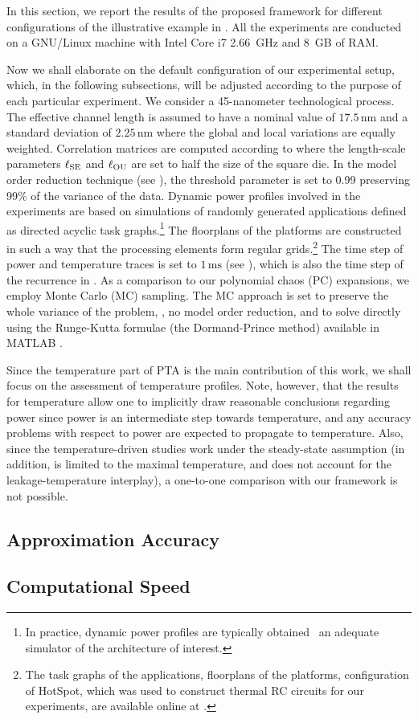 
In this section, we report the results of the proposed framework for different configurations of the illustrative example in .
All the experiments are conducted on a GNU/Linux machine with Intel Core i7 2.66~GHz and 8~GB of RAM.

Now we shall elaborate on the default configuration of our experimental setup, which, in the following subsections, will be adjusted according to the purpose of each particular experiment.
We consider a 45-nanometer technological process.
The effective channel length is assumed to have a nominal value of $17.5\,\text{nm}$ \cite{ptm} and a standard deviation of $2.25\,\text{nm}$ where the global and local variations are equally weighted.
Correlation matrices are computed according to  where the length-scale parameters $\ell_{\text{SE}}$ and $\ell_{\text{OU}}$ are set to half the size of the square die.
In the model order reduction technique (see ), the threshold parameter is set to 0.99 preserving 99\% of the variance of the data.
Dynamic power profiles involved in the experiments are based on simulations of randomly generated applications defined as directed acyclic task graphs.\footnote{In practice, dynamic power profiles are typically obtained \via\ an adequate simulator of the architecture of interest.}
The floorplans of the platforms are constructed in such a way that the processing elements form regular grids.\footnote{The task graphs of the applications, floorplans of the platforms, configuration of HotSpot, which was used to construct thermal RC circuits for our experiments, are available online at \cite{sources}.}
The time step of power and temperature traces is set to $1\,\text{ms}$ (see ), which is also the time step of the recurrence in .
As a comparison to our polynomial chaos (PC) expansions, we employ Monte Carlo (MC) sampling.
The MC approach is set to preserve the whole variance of the problem, \ie, no model order reduction, and to solve  directly using the Runge-Kutta formulae (the Dormand-Prince method) available in MATLAB \cite{matlab}.

Since the temperature part of PTA is the main contribution of this work, we shall focus on the assessment of temperature profiles.
Note, however, that the results for temperature allow one to implicitly draw reasonable conclusions regarding power since power is an intermediate step towards temperature, and any accuracy problems with respect to power are expected to propagate to temperature.
Also, since the temperature-driven studies \cite{juan2011, juan2012, huang2009, lee2013} work under the steady-state assumption (in addition, \cite{juan2011} is limited to the maximal temperature, and \cite{huang2009} does not account for the leakage-temperature interplay), a one-to-one comparison with our framework is not possible.

\subsection{Approximation Accuracy} 


\subsection{Computational Speed} 

